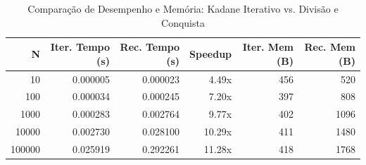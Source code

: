 \begin{table}[htbp]
\centering
\caption{Comparação de Desempenho e Memória: Kadane Iterativo vs. Divisão e Conquista}
\label{tab:kadane_benchmark}
\begin{tabular}{|r|r|r|r|r|r|}
\hline
\textbf{N} & \textbf{Iter. Tempo (s)} & \textbf{Rec. Tempo (s)} & \textbf{Speedup} & \textbf{Iter. Mem (B)} & \textbf{Rec. Mem (B)} \\
\hline
10 & 0.000005 & 0.000023 & 4.49x & 456 & 520 \\
100 & 0.000034 & 0.000245 & 7.20x & 397 & 808 \\
1000 & 0.000283 & 0.002764 & 9.77x & 402 & 1096 \\
10000 & 0.002730 & 0.028100 & 10.29x & 411 & 1480 \\
100000 & 0.025919 & 0.292261 & 11.28x & 418 & 1768 \\
\hline
\end{tabular}
\end{table}

